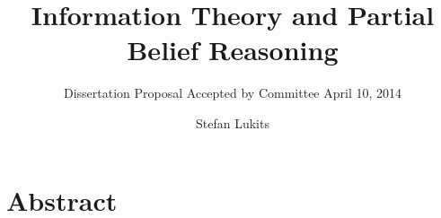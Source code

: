 \documentclass[11pt]{article}
\begin{document}

\title{Information Theory and Partial Belief Reasoning}
\subtitle{Dissertation Proposal Accepted by Committee April 10, 2014}

\author{Stefan Lukits}

\date{}

\maketitle

\newpage

\tableofcontents

\newpage


\section{Abstract}
\label{Abstract}
\end{document}
